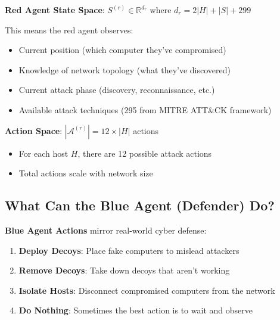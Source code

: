 \documentclass[11pt]{article}
\begin{document}
\begin{mathdetails}
\textbf{Red Agent State Space}: $S^{(r)} \in \mathbb{R}^{d_r}$ where $d_r = 2|H| + |S| + 299$

This means the red agent observes:
\begin{itemize}
\item Current position (which computer they've compromised)
\item Knowledge of network topology (what they've discovered)
\item Current attack phase (discovery, reconnaissance, etc.)
\item Available attack techniques (295 from MITRE ATT\&CK framework)
\end{itemize}

\textbf{Action Space}: $|\mathcal{A}^{(r)}| = 12 \times |H|$ actions
\begin{itemize}
\item For each host $H$, there are 12 possible attack actions
\item Total actions scale with network size
\end{itemize}
\end{mathdetails}

\subsection{What Can the Blue Agent (Defender) Do?}

\begin{intuition}
\textbf{Blue Agent Actions} mirror real-world cyber defense:
\begin{enumerate}
\item \textbf{Deploy Decoys}: Place fake computers to mislead attackers
\item \textbf{Remove Decoys}: Take down decoys that aren't working
\item \textbf{Isolate Hosts}: Disconnect compromised computers from the network
\item \textbf{Do Nothing}: Sometimes the best action is to wait and observe
\end{enumerate}
\end{intuition}
\end{document}

